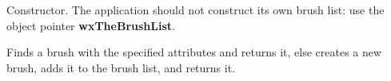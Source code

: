 



\label{wxbrushlistconstr}


Constructor. The application should not construct its own brush list:
use the object pointer {\bf wxTheBrushList}.


\label{wxbrushlistfindorcreatebrush}


Finds a brush with the specified attributes and returns it, else creates a new brush, adds it
to the brush list, and returns it.





